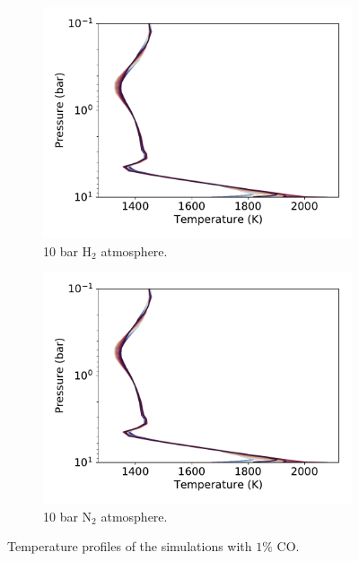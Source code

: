\begin{figure}
  \centering
  \begin{subfigure}[t]{0.49\textwidth}
    \includegraphics[width=\textwidth]{figures/soc-lava-planets/h2-soc-tp.pdf}
    \caption{10 bar H$_{2}$ atmosphere.}\label{fig:soc-tp-h2}
  \end{subfigure}
  \begin{subfigure}[t]{0.49\textwidth}
    \includegraphics[width=\textwidth]{figures/soc-lava-planets/h2-soc-tp.pdf}
    \caption{10 bar N$_{2}$ atmosphere.}\label{fig:soc-tp-n2}
  \end{subfigure}
  \caption{Temperature profiles of the simulations with $1\%$ CO.}
  \label{fig:soc-tp}
\end{figure}


